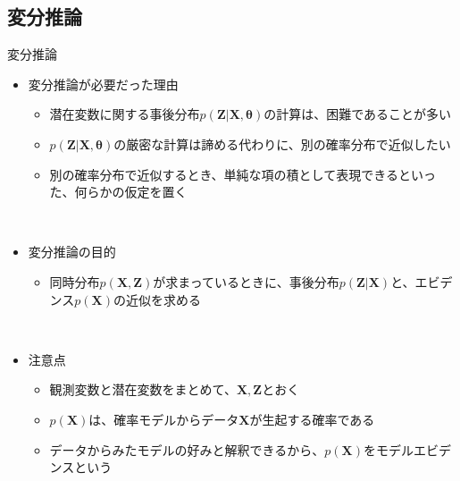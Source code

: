 \documentclass[dvipdfmx,notheorems,t]{beamer}
\begin{document}
\subsection{変分推論}

\begin{frame}{変分推論}

\begin{itemize}
	\item 変分推論が必要だった理由
	\begin{itemize}
		\item 潜在変数に関する事後分布$p(\bm{Z} | \bm{X}, \bm{\theta})$の計算は、困難であることが多い
		\item $p(\bm{Z} | \bm{X}, \bm{\theta})$の厳密な計算は諦める代わりに、\alert{別の確率分布で近似}したい
		\newline
		\item 別の確率分布で近似するとき、単純な項の積として表現できるといった、\alert{何らかの仮定を置く}
	\end{itemize} \
	
	\item 変分推論の目的
	\begin{itemize}
		\item 同時分布$p(\bm{X}, \bm{Z})$が求まっているときに、事後分布$p(\bm{Z} | \bm{X})$と、\alert{エビデンス}$p(\bm{X})$の近似を求める
	\end{itemize} \
	
	\item 注意点
	\begin{itemize}
		\item 観測変数と潜在変数をまとめて、$\bm{X}, \bm{Z}$とおく
		\item $p(\bm{X})$は、確率モデルからデータ$\bm{X}$が生起する確率である
		\item \alert{データからみたモデルの好み}と解釈できるから、$p(\bm{X})$を\alert{モデルエビデンス}という
	\end{itemize}
\end{itemize}

\end{frame}
\end{document}

